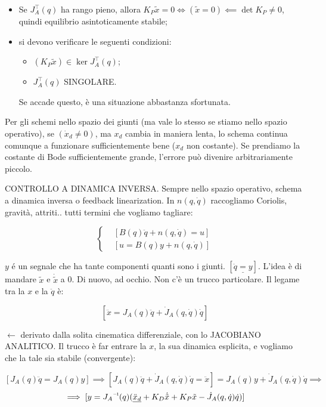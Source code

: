 \begin{itemize}

\item Se $J_A^\top(q)$ ha rango pieno, allora $K_P\tilde{x}=0\iff(\tilde{x}=0)\impliedby \det{K_P}\neq 0$, quindi equilibrio asintoticamente stabile;
\item si devono verificare le seguenti condizioni:

\begin{itemize}

\item{$(K_P\tilde{x})\in\ker{J_A^\top(q)}$};
\item{$J_A^\top(q)$ SINGOLARE}.

\end{itemize}

Se accade questo, è una situazione abbastanza sfortunata.

\end{itemize}

Per gli schemi nello spazio dei giunti (ma vale lo stesso se stiamo nello spazio operativo), se $(\dot{x}_d\neq 0)$, ma $x_d$ cambia in maniera lenta, lo schema continua comunque a funzionare sufficientemente bene ($x_d$ non costante). Se prendiamo la costante di Bode sufficientemente grande, l'errore può divenire arbitrariamente piccolo. 

CONTROLLO A DINAMICA INVERSA. Sempre nello spazio operativo, schema a dinamica inversa o feedback linearization. In $n(q,\dot{q})$ raccogliamo Coriolis, gravità, attriti.. tutti termini che vogliamo tagliare:

\[	
	\left\{
	\begin{aligned}
	&[B(q)\ddot{q}+n(q,\dot{q}) = u]\\
	&[u = B(q)y+n(q,\dot{q})]
	\end{aligned}
	\right.
\]

$y$ é un segnale che ha tante componenti quanti sono i giunti. $[\underline{\ddot{q}=y}]$. L'idea è di mandare $\tilde{x}$ e $\dot{\tilde{x}}$ a 0. Di nuovo, ad occhio. Non c'è un trucco particolare. Il legame tra la $x$ e la $\ddot{q}$ è:

\[
	[\ddot{x} = J_A(q)\ddot{q} + \dot{J}_A(q,\dot{q})\dot{q}]
\]

$\leftarrow$ derivato dalla solita cinematica differenziale, con lo JACOBIANO ANALITICO. Il trucco è far entrare la $x$, la sua dinamica esplicita, e vogliamo che la tale sia stabile (convergente):

\[
	[J_A(q)\ddot{q}=J_A(q)y] \implies [J_A(q)\ddot{q}+\dot{J}_A(q,\dot{q})\dot{q} = \ddot{x}] = J_A(q)y + \dot{J}_A(q,\dot{q})\dot{q} \implies
\]
\[
	\implies [y = \inv{J_A}(q)(\underline{\ddot{x}_d} + K_D\dot{\tilde{x}} + K_P\tilde{x} - \dot{J}_A(q,\dot{q})\dot{q})]
\]

